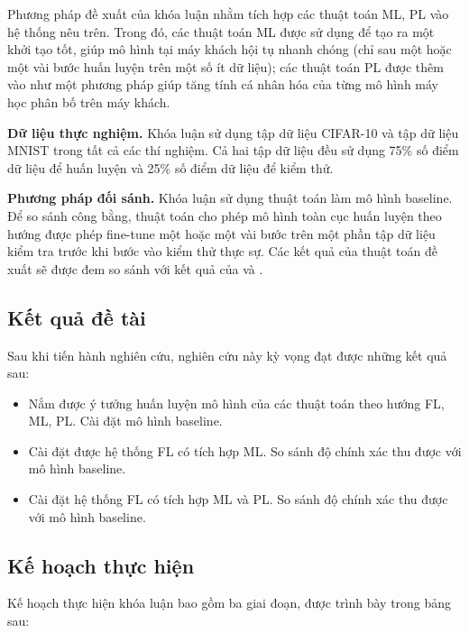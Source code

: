 Phương pháp đề xuất của khóa luận nhằm tích hợp các thuật toán ML, PL vào hệ thống nêu trên. Trong đó, các thuật toán ML được sử dụng để tạo ra một khởi tạo tốt, giúp mô hình tại máy khách hội tụ nhanh chóng (chỉ sau một hoặc một vài bước huấn luyện trên một số ít dữ liệu); các thuật toán PL được thêm vào như một phương pháp giúp tăng tính cá nhân hóa của từng mô hình máy học phân bố trên máy khách.

\textbf{Dữ liệu thực nghiệm.} Khóa luận sử dụng tập dữ liệu CIFAR-10 và tập dữ liệu MNIST trong tất cả các thí nghiệm. Cả hai tập dữ liệu đều sử dụng 75\% số điểm dữ liệu để huấn luyện và 25\% số điểm dữ liệu để kiểm thử.

\textbf{Phương pháp đối sánh.} Khóa luận sử dụng thuật toán  làm mô hình baseline. Để so sánh công bằng, thuật toán  cho phép mô hình toàn cục huấn luyện theo hướng  được phép fine-tune một hoặc một vài bước trên một phần tập dữ liệu kiểm tra trước khi bước vào kiểm thử thực sự. Các kết quả của thuật toán đề xuất sẽ được đem so sánh với kết quả của  và .

\subsection*{Kết quả đề tài}

Sau khi tiến hành nghiên cứu, nghiên cứu này kỳ vọng đạt được những kết quả sau:

\begin{itemize}
    \item Nắm được ý tưởng huấn luyện mô hình của các thuật toán theo hướng FL, ML, PL. Cài đặt mô hình baseline.
    \item Cài đặt được hệ thống FL có tích hợp ML. So sánh độ chính xác thu được với mô hình baseline.
    \item Cài đặt hệ thống FL có tích hợp ML và PL. So sánh độ chính xác thu được với mô hình baseline.
\end{itemize}

\subsection*{Kế hoạch thực hiện}

Kế hoạch thực hiện khóa luận bao gồm ba giai đoạn, được trình bày trong bảng sau:

